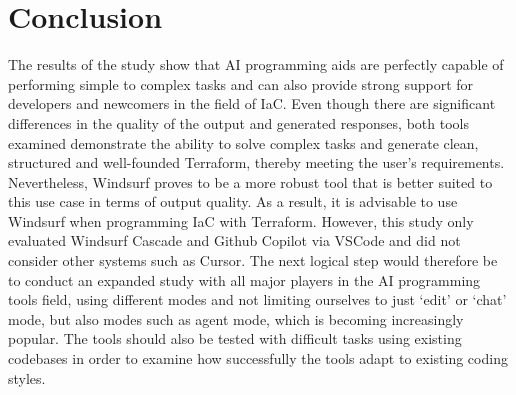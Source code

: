\section{Conclusion}
\label{sec:conclusion}

The results of the study show that AI programming aids are perfectly capable of performing simple to complex tasks and can also provide strong support for developers and newcomers in the field of IaC. Even though there are significant differences in the quality of the output and generated responses, both tools examined demonstrate the ability to solve complex tasks and generate clean, structured and well-founded Terraform, thereby meeting the user's requirements. Nevertheless, Windsurf proves to be a more robust tool that is better suited to this use case in terms of output quality. As a result, it is advisable to use Windsurf when programming IaC with Terraform. However, this study only evaluated Windsurf Cascade and Github Copilot via VSCode and did not consider other systems such as Cursor. The next logical step would therefore be to conduct an expanded study with all major players in the AI programming tools field, using different modes and not limiting ourselves to just ‘edit’ or ‘chat’ mode, but also modes such as agent mode, which is becoming increasingly popular. The tools should also be tested with difficult tasks using existing codebases in order to examine how successfully the tools adapt to existing coding styles.